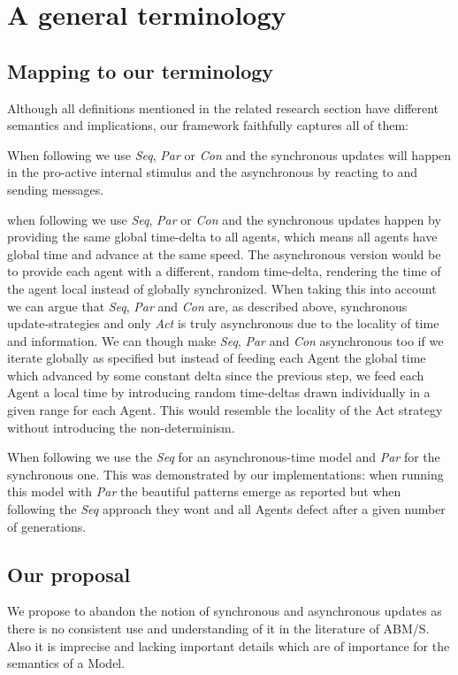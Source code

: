 \section{A general terminology}

\subsection{Mapping to our terminology}
Although all definitions mentioned in the related research section have different semantics and implications, our framework faithfully captures all of them:

When following \cite{yuxuan_agent-based_2016} we use \textit{Seq}, \textit{Par} or \textit{Con} and the synchronous updates will happen in the pro-active internal stimulus and the asynchronous by reacting to and sending messages.

when following \cite{dawson_opening_2014} we use \textit{Seq}, \textit{Par} or \textit{Con} and the synchronous updates happen by providing the same global time-delta to all agents, which means all agents have global time and advance at the same speed. The asynchronous version would be to provide each agent with a different, random time-delta, rendering the time of the agent local instead of globally synchronized. When taking this into account we can argue that \textit{Seq}, \textit{Par} and \textit{Con} are, as described above, synchronous update-strategies and only \textit{Act} is truly asynchronous due to the locality of time and information. We can though make \textit{Seq}, \textit{Par} and \textit{Con} asynchronous too if we iterate globally as specified but instead of feeding each Agent the global time which advanced by some constant delta since the previous step, we feed each Agent a local time by introducing random time-deltas drawn individually in a given range for each Agent. This would resemble the locality of the Act strategy without introducing the non-determinism.

When following \cite{huberman_evolutionary_1993} we use the \textit{Seq} for an asynchronous-time model and \textit{Par} for the synchronous one. This was demonstrated by our implementations: when running this model with \textit{Par} the beautiful patterns emerge as reported but when following the \textit{Seq} approach they wont and all Agents defect after a given number of generations.

\subsection{Our proposal}
We propose to abandon the notion of synchronous and asynchronous updates as there is no consistent use and understanding of it in the literature of ABM/S. Also it is imprecise and lacking important details which are of importance for the semantics of a Model. 

